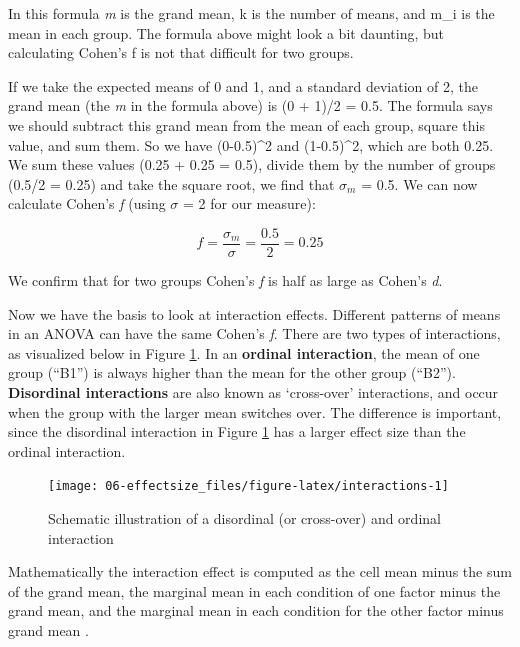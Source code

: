 \documentclass[
  oneside]{book}
\begin{document}
In this formula \emph{m} is the grand mean, k is the number of means, and m\_i is the mean in each group. The formula above might look a bit daunting, but calculating Cohen's f is not that difficult for two groups.

If we take the expected means of 0 and 1, and a standard deviation of 2, the grand mean (the \emph{m} in the formula above) is (0 + 1)/2 = 0.5. The formula says we should subtract this grand mean from the mean of each group, square this value, and sum them. So we have (0-0.5)\^{}2 and (1-0.5)\^{}2, which are both 0.25. We sum these values (0.25 + 0.25 = 0.5), divide them by the number of groups (0.5/2 = 0.25) and take the square root, we find that \(\sigma_{ m }\) = 0.5. We can now calculate Cohen's \emph{f} (using \(\sigma\) = 2 for our measure):

\begin{equation}
f = \frac{\sigma _{ m }}{\sigma} = \frac{0.5}{2} = 0.25
\end{equation}

We confirm that for two groups Cohen's \emph{f} is half as large as Cohen's \emph{d}.

Now we have the basis to look at interaction effects. Different patterns of means in an ANOVA can have the same Cohen's \emph{f}. There are two types of interactions, as visualized below in Figure \ref{fig:interactions}. In an \textbf{ordinal interaction}, the mean of one group (``B1'') is always higher than the mean for the other group (``B2''). \textbf{Disordinal interactions} are also known as `cross-over' interactions, and occur when the group with the larger mean switches over. The difference is important, since the disordinal interaction in Figure \ref{fig:interactions} has a larger effect size than the ordinal interaction.



\begin{figure}

{\centering \texttt{[image: 06-effectsize\_files/figure-latex/interactions-1]} 

}

\caption{Schematic illustration of a disordinal (or cross-over) and ordinal interaction}\label{fig:interactions}
\end{figure}

Mathematically the interaction effect is computed as the cell mean minus the sum of the grand mean, the marginal mean in each condition of one factor minus the grand mean, and the marginal mean in each condition for the other factor minus grand mean \citep{maxwell_designing_2004}.
\end{document}
